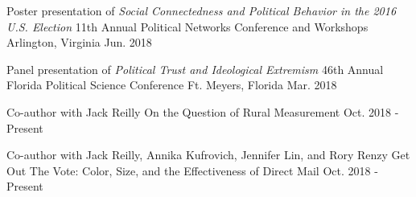 

\begin{cventries}



\cventry
  {Poster presentation of \emph{Social Connectedness and Political Behavior in the 2016 U.S. Election}} %
  {11th Annual Political Networks Conference and Workshops} %
  {Arlington, Virginia} %
  {Jun. 2018} %
  {}


\cventry
  {Panel presentation of \emph{Political Trust and Ideological Extremism}} %
  {46th Annual Florida Political Science Conference} %
  {Ft. Meyers, Florida} %
  {Mar. 2018} %
  {}

\cventry
  {Co-author with Jack Reilly} %
  {On the Question of Rural Measurement} %
  {Oct. 2018 - Present} %
  {} %
  {}


\cventry
  {Co-author with Jack Reilly, Annika Kufrovich, Jennifer Lin, and Rory Renzy} %
  {Get Out The Vote: Color, Size, and the Effectiveness of Direct Mail} %
  {Oct. 2018 - Present} %
  {} %
  {}

\end{cventries}
